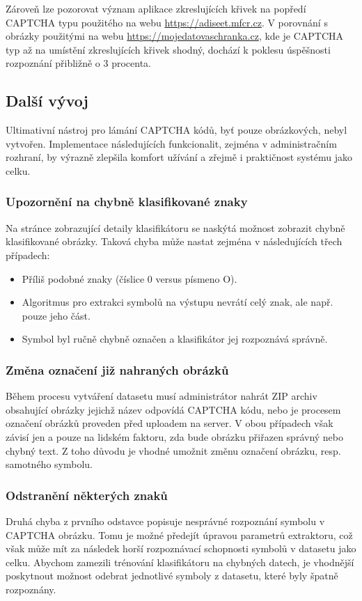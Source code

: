 \documentclass[
  field=ainfp,
  master=true,
  biblatex,
  sourcecodes=false,
  theorems=false,
  glossaries,
  index
]{kidiplom}
\begin{document}
Zároveň lze pozorovat význam aplikace zkreslujících křivek na popředí CAPT\-CHA typu použitého na webu \url{https://adiseet.mfcr.cz}. V porov\-nání s obrázky použitými na webu \url{https://mojedatovaschranka.cz}, kde je CAPTCHA typ až na umístění zkreslujících křivek shodný, dochází k poklesu úspěšnosti rozpoznání přibližně o  3 procenta.

\subsection{Další vývoj}
Ultimativní nástroj pro lámání CAPTCHA kódů, byť pouze obrázkových, nebyl vytvořen. Implementace následujících funkcionalit, zejména v administračním rozhraní, by výrazně zlepšila komfort užívání a zřejmě i praktičnost systému jako celku.

\subsubsection*{Upozornění na chybně klasifikované znaky} 
Na stránce zobrazující detaily klasifikátoru se naskýtá možnost zobrazit chybně klasifikované obrázky. Taková chyba může nastat zejména v následujících třech případech: 
\begin{itemize}
\item Příliš podobné znaky (číslice 0 versus písmeno O).
\item Algoritmus pro extrakci symbolů na výstupu nevrátí celý znak, ale např. pouze jeho část.
\item Symbol byl ručně chybně označen a klasifikátor jej rozpoznává správně.
\end{itemize}

\subsubsection*{Změna označení již nahraných obrázků} 
Během procesu vytváření datasetu musí administrátor nahrát ZIP archiv obsahující obrázky jejichž název odpovídá CAPTCHA kódu, nebo je procesem označení obrázků proveden před uploadem na server. V obou případech však závisí jen a pouze na lidském faktoru, zda bude obrázku přiřazen správný nebo chybný text. Z toho důvodu je vhodné umožnit změnu označení obrázku, resp. samotného symbolu.

\subsubsection*{Odstranění některých znaků}
Druhá chyba z prvního odstavce popisuje nesprávné rozpoznání symbolu v CAPTCHA obrázku. Tomu je možné předejít úpravou parametrů extraktoru, což však může mít za následek horší rozpoznávací schopnosti symbolů v datasetu jako celku. Abychom zamezili trénování klasifikátoru na chybných datech, je vhodnější poskytnout možnost odebrat jednotlivé symboly z datasetu, které byly špatně rozpoznány.
\end{document}
